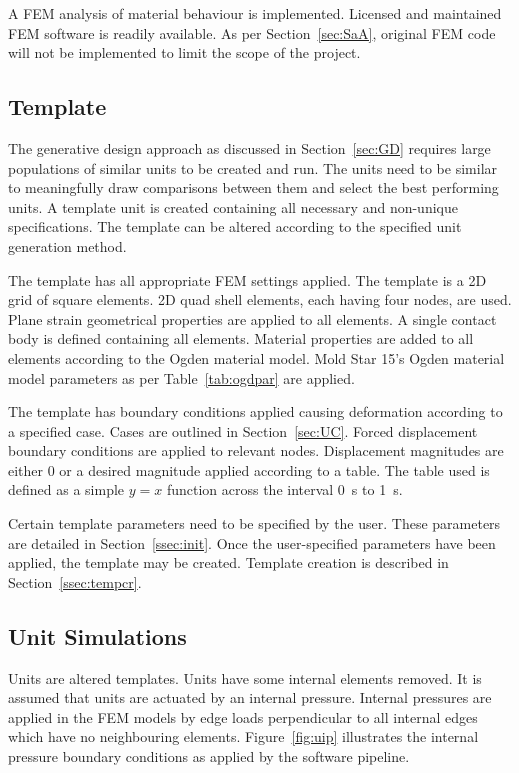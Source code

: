 A FEM analysis of material behaviour is implemented. Licensed and maintained FEM software is readily available. As per Section~\ref{sec:SaA}, original FEM code will not be implemented to limit the scope of the project.

\subsection{Template}

The generative design approach as discussed in Section~\ref{sec:GD} requires large populations of similar units to be created and run. The units need to be similar to meaningfully draw comparisons between them and select the best performing units. A template unit is created containing all necessary and non-unique specifications. The template can be altered according to the specified unit generation method.

The template has all appropriate FEM settings applied. The template is a 2D grid of square elements. 2D quad shell elements, each having four nodes, are used. Plane strain geometrical properties are applied to all elements. A single contact body is defined containing all elements. Material properties are added to all elements according to the Ogden material model. Mold Star 15's Ogden material model parameters as per Table~\ref{tab:ogdpar} are applied.

The template has boundary conditions applied causing deformation according to a specified case. Cases are outlined in Section~\ref{sec:UC}. Forced displacement boundary conditions are applied to relevant nodes. Displacement magnitudes are either 0 or a desired magnitude applied according to a table. The table used is defined as a simple $y=x$ function across the interval \SI{0}{\second} to \SI{1}{\second}.

Certain template parameters need to be specified by the user. These parameters are detailed in Section~\ref{ssec:init}. Once the user-specified parameters have been applied, the template may be created. Template creation is described in Section~\ref{ssec:tempcr}.

\subsection{Unit Simulations}

Units are altered templates. Units have some internal elements removed. It is assumed that units are actuated by an internal pressure. Internal pressures are applied in the FEM models by edge loads perpendicular to all internal edges which have no neighbouring elements. Figure~\ref{fig:uip} illustrates the internal pressure boundary conditions as applied by the software pipeline.

